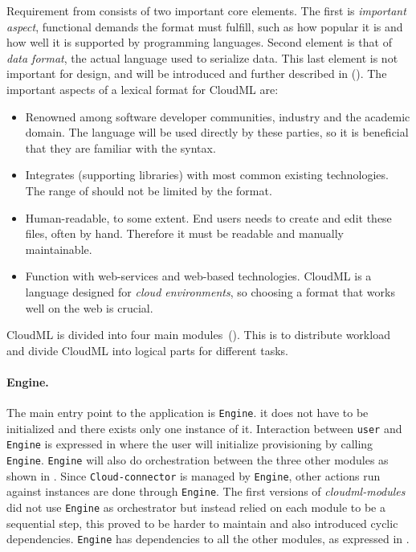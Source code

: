 Requirement  from  consists of two
important core elements.
The first is \emph{important aspect}, \ie functional demands the format must fulfill,
such as how popular it is and how well it is supported by programming languages.
Second element is that of \emph{data format}, \ie the actual language used to 
serialize data.
This last element is not important for design, and will be introduced and
further described in  ().
The important aspects of a lexical format for CloudML are:
\begin{itemize}
  \item Renowned among software developer communities, industry and the academic domain.
    The language will be used directly by these parties, so it is beneficial
    that they are familiar with the syntax.
  \item Integrates (supporting libraries) with most common existing technologies.
    The range of  should not be limited by the format.
  \item Human-readable, to some extent.
    End users needs to create and edit these files, often by hand.
    Therefore it must be readable and manually maintainable.
  \item Function with web-services and web-based technologies.
    CloudML is a language designed for \emph{cloud environments},
    so choosing a format that works well on the web is crucial.
\end{itemize}


CloudML is divided into four main modules~().
This is to distribute workload and divide CloudML into logical parts for different tasks.

\paragraph{Engine.} 




The main entry point to the application is \texttt{Engine}. 
\ie it does not have to be initialized and there exists only one instance of it.
Interaction between \texttt{user} and \texttt{Engine} is expressed in  
where the user will initialize provisioning by calling \texttt{Engine}.
\texttt{Engine} will also do orchestration between the three other modules
as shown in .
Since \texttt{Cloud-connector} is managed by \texttt{Engine},
other actions run against instances are done through \texttt{Engine}.
The first versions of \emph{cloudml-modules} did not use \texttt{Engine} as orchestrator but
instead relied on each module to be a sequential step, this proved to be harder to maintain
and also introduced cyclic dependencies.
\texttt{Engine} has dependencies to all the other modules,
as expressed in .

